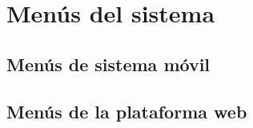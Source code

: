\section{Menús del sistema}
\subsection{Menús de sistema móvil}

\subsection{Menús de la plataforma web}